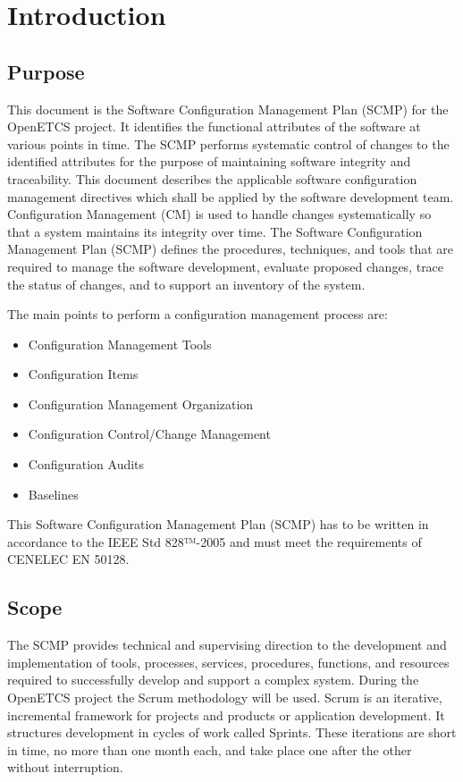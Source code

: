 \documentclass{template/openetcs_article}
\begin{document}
\section[Introduction]{Introduction} %


\subsection{Purpose} %


This document is the Software Configuration Management Plan (SCMP) for the OpenETCS project. It identifies the functional attributes of the software at various points in time. The SCMP performs systematic control of changes to the identified attributes for the purpose of maintaining software integrity and traceability. This document describes the applicable software configuration management directives which shall be applied by the software development team. Configuration Management (CM) is used to handle changes systematically so that a system maintains its integrity over time. The Software Configuration Management Plan (SCMP) defines the procedures, techniques, and tools that are required to manage the software development, evaluate proposed changes, trace the status of changes, and to support an inventory of the system. 

The main points to perform a configuration management process are:

\vspace{-10pt}
\begin{itemize}
\item Configuration Management Tools
\item Configuration Items
\item Configuration Management Organization
\item Configuration Control/Change Management
\item Configuration Audits
\item Baselines
\end{itemize}


This Software Configuration Management Plan (SCMP) has to be written in accordance to the IEEE Std 828™-2005 and must meet the requirements of CENELEC EN 50128.

\subsection{Scope } %
The SCMP provides technical and supervising direction to the development and implementation of tools, processes, services,  procedures, functions, and resources required to successfully develop and support a complex system.
During the OpenETCS project the Scrum methodology will be used. Scrum is an iterative, incremental framework for projects  and products or application development. It structures development in cycles of work called Sprints. These iterations are short  in time, no more than one month each, and take place one after the other without interruption.
\end{document}
